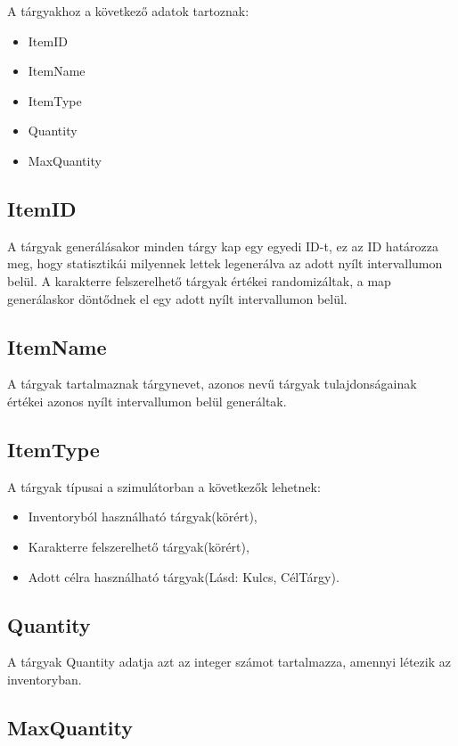
A tárgyakhoz a következő adatok tartoznak:
\begin{itemize}
    \item ItemID
    \item ItemName
    \item ItemType
    \item Quantity
    \item MaxQuantity
\end{itemize}

\subsection{ItemID}

A tárgyak generálásakor minden tárgy kap egy egyedi ID-t, ez az ID határozza meg, hogy statisztikái milyennek lettek legenerálva az adott nyílt intervallumon belül.
A karakterre felszerelhető tárgyak értékei randomizáltak, a map generálaskor döntődnek el egy adott nyílt intervallumon belül.

\subsection{ItemName}

A tárgyak tartalmaznak tárgynevet, azonos nevű tárgyak tulajdonságainak értékei azonos nyílt intervallumon belül generáltak.

\subsection{ItemType}

A tárgyak típusai a szimulátorban a következők lehetnek:
\begin{itemize}
    \item Inventoryból használható tárgyak(körért),
    \item Karakterre felszerelhető tárgyak(körért),
    \item Adott célra használható tárgyak(Lásd: Kulcs, CélTárgy).
\end{itemize}

\subsection{Quantity}

A tárgyak Quantity adatja azt az integer számot tartalmazza, amennyi létezik az inventoryban.

\subsection{MaxQuantity}

